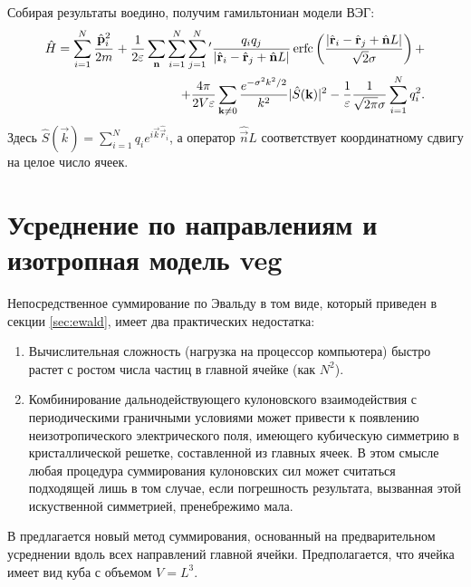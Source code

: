 Собирая результаты воедино, получим гамильтониан модели ВЭГ:
\begin{equation}
    \label{eq:jel:ham_final}
    \begin{aligned}
        \hat{H} = \sum\limits_{i=1}^{N} \cfrac{\hat{\vec{p}}_{i}^2}{2m}\, +
        \frac{1}{2 \epsilon} \sum_{\vec{n}} \sum_{i=1}^N \sum_{j=1}^N {}^\prime \frac{q_i q_j}{|\hat{\vec{r}}_i - \hat{\vec{r}}_j + \hat{\vec{n}}L|}\, \mathrm{erfc} \left( \frac{ |\hat{\vec{r}}_i - \hat{\vec{r}}_j + \hat{\vec{n}}L| }{ \sqrt{2} \sigma } \right) + \\
        + \frac{4\pi}{2V \epsilon} \sum_{\vec{k} \neq 0} \frac{e^{-\sigma^2 k^2 / 2}}{k^2} | \hat{S} (\vec{k}) |^2 - \frac{1}{\epsilon} \frac{1}{\sqrt{2\pi} \sigma} \sum_{i=1}^N q_i^2.
    \end{aligned}
\end{equation}
Здесь $\hat{S} (\vec{k}) = \sum\limits_{i=1}^{N} q_{i} e^{i \vec{k} \hat{\vec{r}}_{i}}$, а оператор $\hat{\vec{n}}L$ соответствует координатному сдвигу на целое число ячеек.

\section{Усреднение по направлениям и изотропная модель \texorpdfstring{\acrshort{veg}}{ВЭГ}}
Непосредственное суммирование по Эвальду в том виде, который приведен в секции \ref{sec:ewald}, имеет два практических недостатка:
\begin{enumerate}
    \item Вычислительная сложность (нагрузка на процессор компьютера) быстро растет с ростом числа частиц в главной ячейке (как $N^2$).
    \item Комбинирование дальнодействующего кулоновского взаимодействия с периодическими граничными условиями может привести к появлению неизотропического электрического поля, имеющего кубическую симметрию в кристаллической решетке, составленной из главных ячеек.
        В этом смысле любая процедура суммирования кулоновских сил может считаться подходящей лишь в том случае, если погрешность результата, вызванная этой искуственной симметрией, пренебрежимо мала.
\end{enumerate}
В \cite{jel:pre-averaged_summation} предлагается новый метод суммирования, основанный на предварительном усреднении вдоль всех направлений главной ячейки.
Предполагается, что ячейка имеет вид куба с объемом $V = L^3$.

